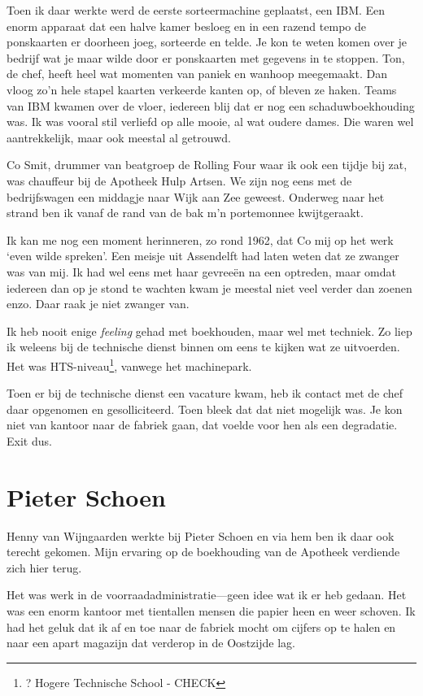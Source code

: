 \documentclass[10pt,twoside, openright]{memoir}
\begin{document}
Toen ik daar werkte werd de eerste sorteermachine geplaatst, een IBM. Een enorm apparaat dat een halve kamer besloeg en in een razend tempo de ponskaarten er doorheen joeg, sorteerde en telde. Je kon te weten komen over je bedrijf wat je maar wilde  door er ponskaarten met gegevens in te stoppen. Ton, de chef, heeft heel wat momenten van paniek en wanhoop meegemaakt. Dan vloog zo’n hele stapel kaarten verkeerde kanten op, of bleven ze haken. Teams van IBM kwamen over de vloer, iedereen blij dat er nog een schaduwboekhouding was. Ik was vooral stil verliefd op alle mooie, al wat oudere dames. Die waren wel aantrekkelijk, maar ook meestal al getrouwd. 

Co Smit, drummer van beatgroep de Rolling Four waar ik ook een tijdje bij zat, was chauffeur bij de Apotheek Hulp Artsen. We zijn nog eens met de bedrijfswagen een middagje naar Wijk aan Zee geweest. Onderweg naar het strand ben ik vanaf de rand van de bak m’n portemonnee kwijtgeraakt.

Ik kan me nog een moment herinneren, zo rond 1962, dat Co mij op het werk `even wilde spreken'. Een meisje uit Assendelft had laten weten dat ze zwanger was van mij. Ik had wel eens met haar gevreeën na een optreden, maar omdat iedereen dan op je stond te wachten kwam je meestal niet veel verder dan zoenen enzo. Daar raak je niet zwanger van. 

Ik heb nooit enige \emph{feeling} gehad met boekhouden, maar wel met techniek. Zo liep ik weleens bij de technische dienst binnen om eens te kijken wat ze uitvoerden. Het was HTS-niveau\footnote{? Hogere Technische School - CHECK}, vanwege het machinepark. 

Toen er bij de technische dienst een vacature kwam, heb ik contact met de chef daar opgenomen en gesolliciteerd. Toen bleek dat dat niet mogelijk was. Je kon niet van kantoor naar de fabriek gaan, dat voelde voor hen als een degradatie. Exit dus.

\chapter{Pieter Schoen} %
\label{cha:schoen}

Henny van Wijngaarden werkte bij Pieter Schoen en via hem ben ik daar ook terecht gekomen. Mijn ervaring op de boekhouding van de Apotheek verdiende zich hier terug.

Het was werk in de voorraadadministratie---geen idee wat ik er heb gedaan. Het was een enorm kantoor met tientallen mensen die papier heen en weer schoven. Ik had het geluk dat ik af en toe naar de fabriek mocht om cijfers op te halen en naar een apart magazijn dat verderop in de Oostzijde lag. 
\end{document}
